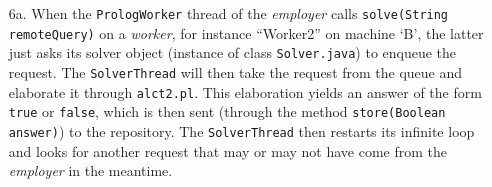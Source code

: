 \documentclass[a4paper, 11pt, oneside]{duthesis}
\begin{document}
\begin{enumerate}
\item[6a.]When the \texttt{PrologWorker} thread of the \emph{employer} calls \texttt{solve(String remoteQuery)} on a \emph{worker}, for instance ``Worker2'' on machine `B', the latter just asks its solver object (instance of class \texttt{Solver.java}) to enqueue the request.
The \texttt{SolverThread} will then take the request from the queue and elaborate it through \texttt{alct2.pl}.
This elaboration yields an answer of the form \texttt{true} or \texttt{false}, which is then sent (through the method \texttt{store(Boolean answer)}) to the repository. The \texttt{SolverThread} then restarts its infinite loop and looks for another request that may or may not have come from the \emph{employer} in the meantime.
\end{enumerate}


\newpage



\end{document}
